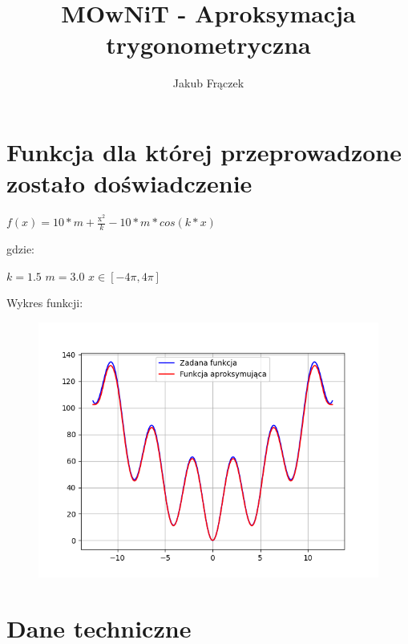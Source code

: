 \documentclass{article}
\title{MOwNiT - Aproksymacja trygonometryczna}
\author{Jakub Frączek}
\begin{document}
\maketitle

\section{Funkcja dla której przeprowadzone zostało doświadczenie}

\begin{center}
\(f(x) = 10 * m + \frac{\mathrm{x}_{}^{2}}{k} - 10 * m * cos(k*x)\)
\end{center}

\noindent
gdzie:

\bigbreak

\(k = 1.5\)
\newline \indent
\(m = 3.0\)
\newline \indent
\(x \in [-4\pi, 4\pi]\)

\bigbreak

\noindent
Wykres funkcji:

\begin{figure}[H]
  \centering
  \begin{minipage}[b]{0.5\textwidth}
    \includegraphics[width=\textwidth]{zadana_funkcja.png}
  \end{minipage}
\end{figure}

\section{Dane techniczne}
\end{document}
